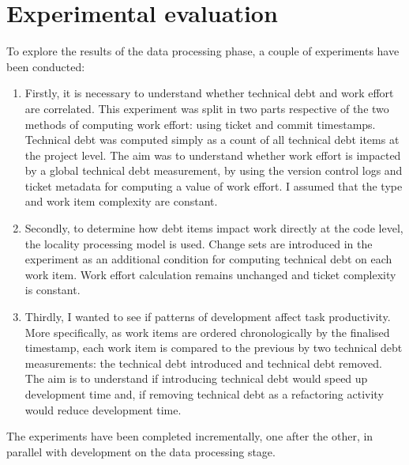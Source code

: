 \documentclass{mpaper}
\begin{document}
\section{Experimental evaluation}
\label{evaluation}

To explore the results of the data processing phase, a couple of experiments
have been conducted:

\begin{enumerate}
  
  \item Firstly, it is necessary to understand whether technical debt and work
  effort are correlated. This experiment was split in two parts respective of
  the two methods of computing work effort: using ticket and commit timestamps.
  Technical debt was computed simply as a count of all technical debt items at
  the project level. The aim was to understand whether work effort is impacted
  by a global technical debt measurement, by using the version control logs and
  ticket metadata for computing a value of work effort. I assumed that the type
  and work item complexity are constant.

  \item Secondly, to determine how debt items impact work directly at the code
  level, the locality processing model is used. Change sets are introduced in
  the experiment as an additional condition for computing technical debt on each
  work item. Work effort calculation remains unchanged and ticket complexity is
  constant.
  
  \item Thirdly, I wanted to see if patterns of development affect task
  productivity. More specifically, as work items are ordered chronologically by
  the finalised timestamp, each work item is compared to the previous by two
  technical debt measurements: the technical debt introduced and technical debt
  removed. The aim is to understand if introducing technical debt would speed up
  development time and, if removing technical debt as a refactoring activity
  would reduce development time.  
\end{enumerate}

The experiments have been completed incrementally, one after the other, in
parallel with development on the data processing stage. 
\end{document}
